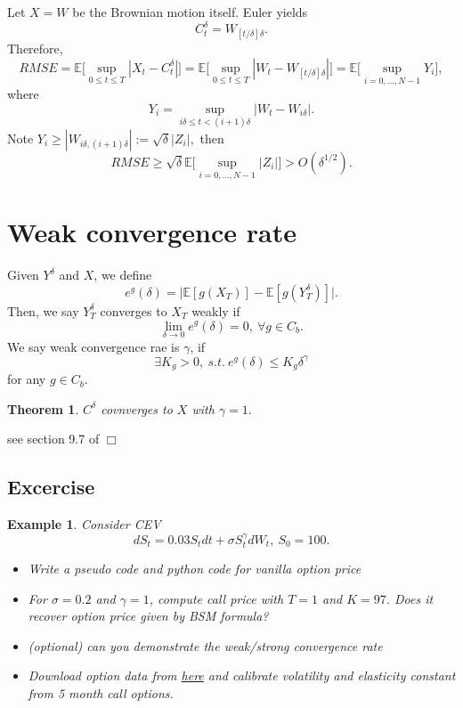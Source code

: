 \documentclass{article}
\newtheorem{theorem}{Theorem}
\newtheorem{example}{Example}
\newenvironment{proof}{\noindent {\sc Proof:}}{$\Box$} %
\begin{document}
Let $X = W$ be the Brownian motion itself.
Euler yields
$$C_{t}^{\delta} = W_{[t/\delta] \delta}.$$
Therefore, 
$$RMSE = 
\mathbb E  \Big [\sup_{0 \le t\le T} |X_{t} - C_{t}^{\delta}| \Big] 
= \mathbb E  \Big [\sup_{0 \le t\le T} |W_{t} - W_{[t/\delta]\delta}| \Big] 
=  \mathbb E  \Big [\sup_{i = 0, \ldots, N-1} Y_{i} \Big],
$$
where 
$$Y_{i} = \sup_{i\delta \le t < (i+1) \delta} |W_{t} - W_{i\delta}|.$$
Note $Y_{i} \ge |W_{i\delta, (i+1)\delta}| := \sqrt \delta |Z_{i}|,$ then 
$$RMSE \ge  \sqrt \delta  \mathbb E  
\Big [\sup_{i = 0, \ldots, N-1} |Z_{i}| \Big ]
> O(\delta^{1/2}).$$

\section{Weak convergence rate}
Given $Y^{\delta}$ and $X$, we define
$$e^{g} (\delta) = \Big| \mathbb E[ g(X_{T})] - 
\mathbb E[g (Y^{\delta}_{T})] \Big|.$$
Then, we say $Y^{\delta}_{T} $ converges to $X_{T}$ weakly if
$$\lim_{\delta\to 0} e^{g} (\delta) = 0, \ \forall g \in C_{b}.$$
We say weak convergence rae is $\gamma$, if
$$\exists K_{g} >0, \ s.t. \ e^{g}(\delta) \le K_{g} \delta^{\gamma}$$
for any $g\in C_{b}$.

\begin{theorem}
 $C^{\delta}$ covnverges to $X$ with $\gamma = 1.$
\end{theorem}
\begin{proof}
 see section 9.7 of  \cite{KP92}
\end{proof}

\subsection{Excercise}

\begin{example}
 \label{ex:cevel}
 Consider CEV 
$$d S_{t} = 0.03 S_{t} dt + \sigma S_{t}^{\gamma} dW_{t}, \ S_{0} =100.$$
\begin{itemize}
\item  Write a pseudo code and python code for vanilla option price
\item For $\sigma = 0.2$ and $\gamma = 1$, compute call price with $T =1$ and $K = 97$. Does it recover option price given by BSM formula?
\item (optional) can you demonstrate the weak/strong convergence rate 
\item Download option data from  
\href{https://github.com/songqsh/20s_ma573/blob/master/src/20optiondata2.dat}{here}
and calibrate volatility and elasticity constant from 5 month call options.
 \end{itemize}
\end{example}



%
%

\end{document}
